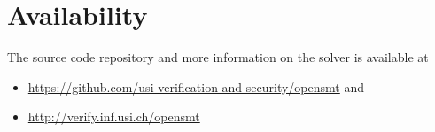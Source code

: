 \documentclass{easychair}
\begin{document}
\section{Availability}
The source code repository and more information on the solver is
available at

\begin{itemize}
    \item \url{https://github.com/usi-verification-and-security/opensmt}
        and
    \item \url{http://verify.inf.usi.ch/opensmt}
\end{itemize}

\end{document}
